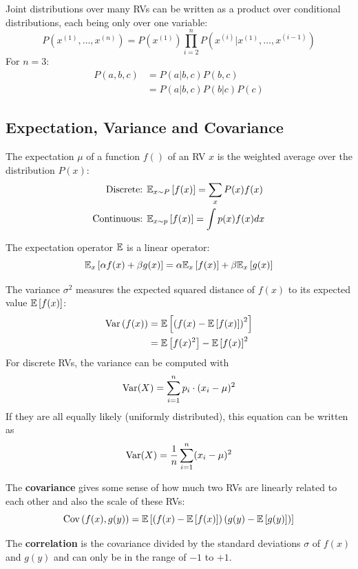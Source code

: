 \begin{multicols}{2}
	Joint distributions over many RVs can be written as a product over conditional distributions, each being only over one variable:
	\[ P\left(x^{(1)},\dots,x^{(n)}\right) = P(x^{(1)}) \prod_{i=2}^{n} P\left( x^{(i)}|x^{(1)},\dots,x^{(i-1)} \right) \]
	For $n=3$:
	\begin{align*}
	P(a,b,c)
	&= P(a|b,c)P(b,c)\\
	&= P(a|b,c)P(b|c)P(c)
	\end{align*}

	\subsection{Expectation, Variance and Covariance}
	The expectation $\mu$ of a function $f()$ of an RV $x$ is the weighted average over the distribution $P(x)$:
	\begin{align*}
	\text{Discrete: }  &\mathbb{E}_{x\sim P}\left[f(x)\right] = \sum_x P(x)f(x)\\
	\text{Continuous: }  &\mathbb{E}_{x\sim p}\left[f(x)\right] = \int p(x)f(x)dx
	\end{align*}

	The expectation operator $\mathbb{E}$ is a linear operator:
	\[ \mathbb{E}_x \left[ \alpha f(x) + \beta g(x) \right] = \alpha\mathbb{E}_x \left[f(x)\right] + \beta\mathbb{E}_x \left[g(x)\right]\]

	The variance $\sigma^2$ measures the expected squared distance of $f(x)$ to its expected value $\mathbb{E}\left[f(x)\right]$:
	\begin{align*}
	\text{Var}\left( f(x) \right) &= \mathbb{E} \left[ \left( f(x) - \mathbb{E} \left[ f(x) \right] \right)^2 \right]\\
	&= \mathbb{E} \left[ f(x)^2 \right] - \mathbb{E} \left[ f(x) \right]^2
	\end{align*}
	For discrete RVs, the variance can be computed with
	\[ \text{Var}(X) = \sum_{i=1}^{n} p_i \cdot (x_i-\mu)^2 \]
	If they are all equally likely (uniformly distributed), this equation can be written as
	\[ \text{Var}(X) = \frac{1}{n} \sum_{i=1}^{n} (x_i-\mu )^2 \]

	The \textbf{covariance} gives some sense of how much two RVs are linearly related to each other and also the scale of these RVs:
	\[ \text{Cov}\left( f(x),g(y) \right) =
	\mathbb{E} \left[ \left( f(x) -\mathbb{E} \left[ f(x) \right] \right)\left( g(y) -\mathbb{E} \left[ g(y) \right] \right) \right] \]

	The \textbf{correlation} is the covariance divided by the standard deviations $\sigma$ of $f(x)$ and $g(y)$ and can only be in the range of $-1$ to $+1$.\\


\end{multicols}
